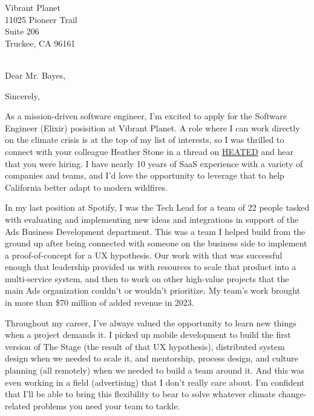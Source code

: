 

	{Vibrant Planet
	\\11025 Pioneer Trail
    \\Suite 206
	\\Truckee, CA 96161}

\date{February 19, 2024}
\opening{\\Dear Mr. Bayes,}
\closing{Sincerely,}
\makelettertitle

As a mission-driven software engineer, I'm excited to apply for the Software Engineer (Elixir) posisition at Vibrant Planet.
A role where I can work directly on the climate crisis is at the top of my list of interests,
so I was thrilled to connect with your colleague Heather Stone in a thread on
\href{https://heated.world/}{HEATED} and hear that you were hiring.
I have nearly 10 years of SaaS experience with a variety of companies and teams,
and I'd love the opportunity to leverage that to help California better adapt to modern wildfires.

In my last position at Spotify, I was the Tech Lead for a team of 22 people tasked with evaluating and implementing new ideas
and integrations in support of the Ads Business Development department. This was a team I helped build from the ground up after being
connected with someone on the business side to implement a proof-of-concept for a UX hypothesis.
Our work with that was successful enough that leadership provided us with resources to scale that product into a multi-service system,
and then to work on other high-value projects that the main Ads organization couldn't or wouldn't prioritize.
My team's work brought in more than \$70 million of added revenue in 2023.

Throughout my career, I've always valued the opportunity to learn new things when a project demands it.
I picked up mobile development to build the first version of The Stage (the result of that UX hypothesis),
distributed system design when we needed to scale it,
and mentorship, process design, and culture planning (all remotely) when we needed to build a team around it.
And this was even working in a field (advertising) that I don't really care about.
I'm confident that I'll be able to bring this flexibility to bear to solve whatever climate change-related problems
you need your team to tackle.


